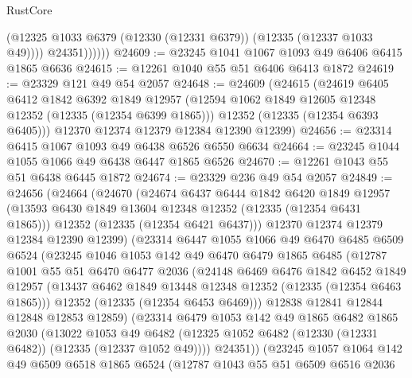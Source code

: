 \begin{lexlean}{RustCore}
\begin{coremodule}
                  (@12325 @1033 @6379 (@12330 (@12331 @6379)) (@12335 (@12337 @1033 @49))))
                @24351))))))
@24609 := @23245 @1041 @1067 @1093 @49 @6406 @6415 @1865 @6636
@24615 := @12261 @1040 @55 @51 @6406 @6413 @1872
@24619 := @23329 @121 @49 @54 @2057
@24648 := @24609
    (@24615
      (@24619
        @6405
        @6412
        @1842
        @6392
        @1849
        @12957
        (@12594 @1062 @1849 @12605 @12348 @12352 (@12335 (@12354 @6399 @1865)))
        @12352
        (@12335 (@12354 @6393 @6405)))
      @12370
      @12374
      @12379
      @12384
      @12390
      @12399)
@24656 := @23314 @6415 @1067 @1093 @49 @6438 @6526 @6550 @6634
@24664 := @23245 @1044 @1055 @1066 @49 @6438 @6447 @1865 @6526
@24670 := @12261 @1043 @55 @51 @6438 @6445 @1872
@24674 := @23329 @236 @49 @54 @2057
@24849 := @24656
    (@24664
      (@24670
        (@24674
          @6437
          @6444
          @1842
          @6420
          @1849
          @12957
          (@13593 @6430 @1849 @13604 @12348 @12352 (@12335 (@12354 @6431 @1865)))
          @12352
          (@12335 (@12354 @6421 @6437)))
        @12370
        @12374
        @12379
        @12384
        @12390
        @12399)
      (@23314
        @6447
        @1055
        @1066
        @49
        @6470
        @6485
        @6509
        @6524
        (@23245
          @1046
          @1053
          @142
          @49
          @6470
          @6479
          @1865
          @6485
          (@12787
            @1001
            @55
            @51
            @6470
            @6477
            @2036
            (@24148
              @6469
              @6476
              @1842
              @6452
              @1849
              @12957
              (@13437 @6462 @1849 @13448 @12348 @12352 (@12335 (@12354 @6463 @1865)))
              @12352
              (@12335 (@12354 @6453 @6469)))
            @12838
            @12841
            @12844
            @12848
            @12853
            @12859)
          (@23314
            @6479
            @1053
            @142
            @49
            @1865
            @6482
            @1865
            @2030
            (@13022
              @1053
              @49
              @6482
              (@12325 @1052 @6482 (@12330 (@12331 @6482)) (@12335 (@12337 @1052 @49))))
            @24351))
        (@23245
          @1057
          @1064
          @142
          @49
          @6509
          @6518
          @1865
          @6524
          (@12787
            @1043
            @55
            @51
            @6509
            @6516
            @2036

\end{coremodule}
\end{lexlean}
